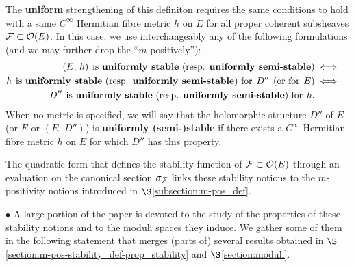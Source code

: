 \documentclass[12pt]{article}
\begin{document}
The {\bf uniform} strengthening of this definiton requires the same conditions to hold with a same $C^\infty$ Hermitian fibre metric $h$ on $E$ for all proper coherent subsheaves ${\cal F}\subset{\cal O}(E)$. In this case, we use interchangeably any of the following formulations (and we may further drop the ``$m$-positively''): \begin{eqnarray*}(E,\,h) \hspace{1ex}\mbox{is {\bf uniformly stable} (resp. {\bf uniformly semi-stable})} & \iff & \\
  h \hspace{1ex}\mbox{is {\bf uniformly stable} (resp. {\bf uniformly semi-stable}) for}\hspace{1ex} D'' \hspace{1ex} \mbox{(or for}\hspace{1ex} E) &\iff & \\
  D'' \hspace{1ex}\mbox{is {\bf uniformly stable} (resp. {\bf uniformly semi-stable}) for}\hspace{1ex} h.\end{eqnarray*} When no metric is specified, we will say that the holomorphic structure $D''$ of $E$ (or $E$ or $(E,\,D'')$) is {\bf uniformly (semi-)stable} if there exists a $C^\infty$ Hermitian fibre metric $h$ on $E$ for which $D''$ has this property.

\vspace{2ex}

The quadratic form that defines the stability function of ${\cal F}\subset{\cal O}(E)$ through an evaluation on the canonical section $\sigma_{\cal F}$ links these stability notions to the $m$-positivity notions introduced in $\S$\ref{subsection:m-pos_def}. 

\vspace{2ex}

$\bullet$ A large portion of the paper is devoted to the study of the properties of these stability notions and to the moduli spaces they induce. We gather some of them in the following statement that merges (parts of) several results obtained in $\S$\ref{section:m-pos-stability_def-prop_stability} and $\S$\ref{section:moduli}.
\end{document}
